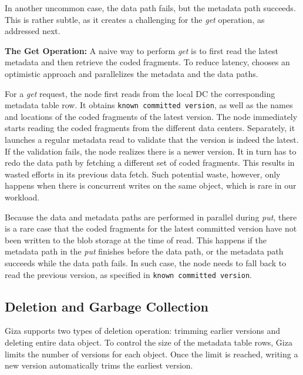 In another uncommon case, the data path fails, but the metadata path succeeds.
This is rather subtle, as it creates a challenging for the {\em get} operation,
as addressed next.

{\bf The Get Operation:}
A naive way to perform {\em get} is to first read the latest metadata and then retrieve the coded fragments.
To reduce latency, {\name} chooses an optimistic approach and parallelizes the metadata and the data paths.

For a {\em get} request, the {\name} node first reads from the local DC the corresponding metadata table row.
It obtains {\tt known committed version}, as well as the names and locations of the coded fragments of the latest version.
The \name node immediately starts reading the coded fragments from the different data centers.
Separately, it launches a regular metadata read to validate that the version is indeed the latest.
If the validation fails, the \name node realizes there is a newer version.
It in turn has to redo the data path by fetching a different set of coded fragments.
This results in wasted efforts in its previous data fetch.
Such potential waste, however, only happens when there is concurrent writes on the same object,
which is rare in our workload.

Because the data and metadata paths are performed in parallel during {\em put},
there is a rare case that the coded fragments for the latest committed version
have not been written to the blob storage at the time of read.
This happens if the metadata path in the {\em put} finishes before the data path,
or the metadata path succeeds while the data path fails.
In such case, the {\name} node needs to fall back to read the previous version,
as specified in {\tt known committed version}.


\subsection{Deletion and Garbage Collection}

Giza supports two types of deletion operation: trimming earlier versions and deleting entire data object.
To control the size of the metadata table rows, Giza limits the number of versions for each object.
Once the limit is reached, writing a new version automatically trims the earliest version.

